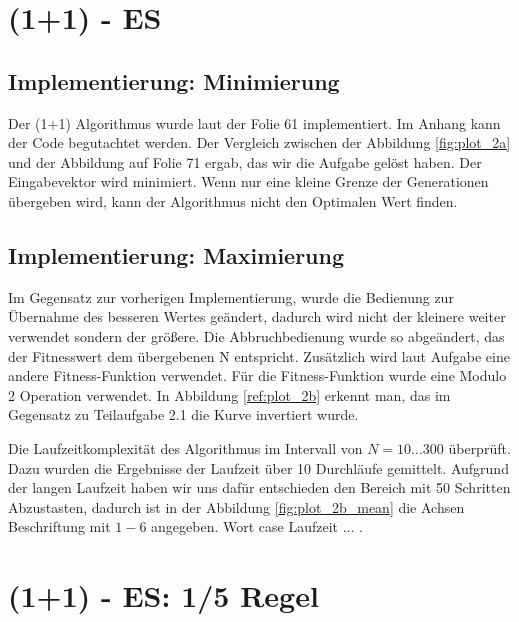 \chapter{(1+1) - ES}

\section{Implementierung: Minimierung}

Der (1+1) Algorithmus wurde laut der Folie 61 implementiert. Im Anhang kann der Code begutachtet werden. Der Vergleich zwischen der Abbildung \ref{fig:plot_2a} und der Abbildung auf Folie 71 ergab, das wir die Aufgabe gelöst haben. Der Eingabevektor wird minimiert. Wenn nur eine kleine Grenze der Generationen übergeben wird, kann der Algorithmus nicht den Optimalen Wert finden.


\section{Implementierung: Maximierung}

Im Gegensatz zur vorherigen Implementierung, wurde die Bedienung zur Übernahme des besseren Wertes geändert, dadurch wird nicht der kleinere weiter verwendet sondern der größere. Die Abbruchbedienung wurde so abgeändert, das der Fitnesswert dem übergebenen N entspricht. Zusätzlich wird laut Aufgabe eine andere Fitness-Funktion verwendet. Für die Fitness-Funktion wurde eine Modulo 2 Operation verwendet. In Abbildung \ref{ref:plot_2b} erkennt man, das im Gegensatz zu Teilaufgabe 2.1 die Kurve invertiert wurde.


\newpage

Die Laufzeitkomplexität des Algorithmus im Intervall von $N=10 ... 300$ überprüft. Dazu wurden die Ergebnisse der Laufzeit über 10 Durchläufe gemittelt. Aufgrund der langen Laufzeit haben wir uns dafür entschieden den Bereich mit 50 Schritten Abzustasten, dadurch ist in der Abbildung \ref{fig:plot_2b_mean} die Achsen Beschriftung mit $1-6$ angegeben. Wort case Laufzeit  ... .


\chapter{(1+1) - ES: 1/5 Regel}

